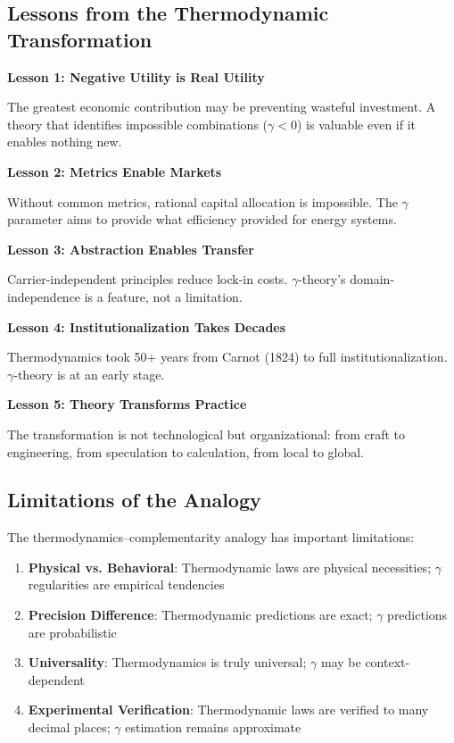 \subsection{Lessons from the Thermodynamic Transformation}

\begin{tcolorbox}[colback=green!5!white, colframe=green!75!black,
    title=Key Lessons]

\textbf{Lesson 1: Negative Utility is Real Utility}

The greatest economic contribution may be preventing wasteful investment.
A theory that identifies impossible combinations ($\gamma < 0$) is valuable
even if it enables nothing new.

\textbf{Lesson 2: Metrics Enable Markets}

Without common metrics, rational capital allocation is impossible. The $\gamma$
parameter aims to provide what efficiency provided for energy systems.

\textbf{Lesson 3: Abstraction Enables Transfer}

Carrier-independent principles reduce lock-in costs. $\gamma$-theory's
domain-independence is a feature, not a limitation.

\textbf{Lesson 4: Institutionalization Takes Decades}

Thermodynamics took 50+ years from Carnot (1824) to full institutionalization.
$\gamma$-theory is at an early stage.

\textbf{Lesson 5: Theory Transforms Practice}

The transformation is not technological but organizational: from craft to
engineering, from speculation to calculation, from local to global.

\end{tcolorbox}

\subsection{Limitations of the Analogy}

The thermodynamics--complementarity analogy has important limitations:

\begin{enumerate}
    \item \textbf{Physical vs. Behavioral}: Thermodynamic laws are physical
    necessities; $\gamma$ regularities are empirical tendencies

    \item \textbf{Precision Difference}: Thermodynamic predictions are exact;
    $\gamma$ predictions are probabilistic

    \item \textbf{Universality}: Thermodynamics is truly universal; $\gamma$
    may be context-dependent

    \item \textbf{Experimental Verification}: Thermodynamic laws are verified
    to many decimal places; $\gamma$ estimation remains approximate
\end{enumerate}

